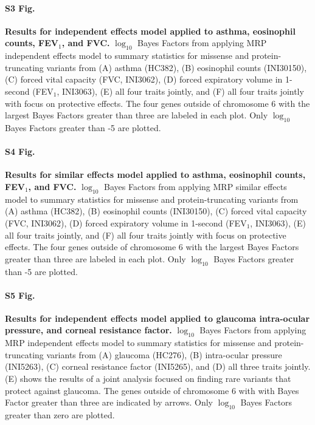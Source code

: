 \paragraph*{S3 Fig.}
\label{asthma_independent}
{\bf Results for independent effects model applied to asthma, eosinophil counts, FEV$_1$, and FVC.} $\log_{10}$ Bayes Factors from applying MRP independent effects model to summary statistics for missense and protein-truncating variants from (A) asthma (HC382), (B) eosinophil counts (INI30150), (C) forced vital capacity (FVC, INI3062), (D) forced expiratory volume in 1-second (FEV$_1$, INI3063), (E) all four traits jointly, and (F) all four traits jointly with focus on protective effects. The four genes outside of chromosome 6 with the largest Bayes Factors greater than three are labeled in each plot. Only $\log_{10}$ Bayes Factors greater than -5 are plotted.

\paragraph*{S4 Fig.}
\label{asthma_similar}
{\bf Results for similar effects model applied to asthma, eosinophil counts, FEV$_1$, and FVC.} $\log_{10}$ Bayes Factors from applying MRP similar effects model to summary statistics for missense and protein-truncating variants from (A) asthma (HC382), (B) eosinophil counts (INI30150), (C) forced vital capacity (FVC, INI3062), (D) forced expiratory volume in 1-second (FEV$_1$, INI3063), (E) all four traits jointly, and (F) all four traits jointly with focus on protective effects. The four genes outside of chromosome 6 with the largest Bayes Factors greater than three are labeled in each plot. Only $\log_{10}$ Bayes Factors greater than -5 are plotted.

\paragraph*{S5 Fig.}
\label{glaucoma_independent}
{\bf Results for independent effects model applied to glaucoma intra-ocular pressure, and corneal resistance factor.} $\log_{10}$ Bayes Factors from applying MRP independent effects model to summary statistics for missense and protein-truncating variants from (A) glaucoma (HC276), (B) intra-ocular pressure (INI5263), (C) corneal resistance factor (INI5265), and (D) all three traits jointly. (E) shows the results of a joint analysis focused on finding rare variants that protect against glaucoma. The genes outside of chromosome 6 with with Bayes Factor greater than three are indicated by arrows. Only $\log_{10}$ Bayes Factors greater than zero are plotted.

